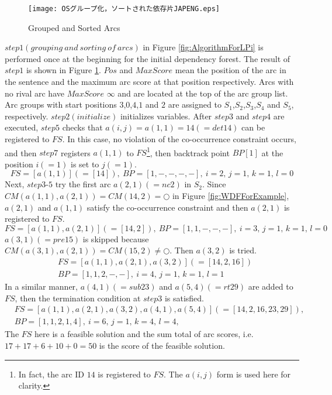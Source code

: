 \begin{figure}[b]
\begin{center}
     \texttt{[image: OSグループ化，ソートされた依存片JAPENG.eps]}
\end{center}
\myfiglabelskippre
\caption{Grouped and Sorted Arcs}
\label{fig:SortedDepPces}
\end{figure}

$step1(grouping\ and\ sorting\ of\ arcs)$ in Figure
\ref{fig:AlgorithmForLPi} is performed once at the beginning for the
initial dependency forest. The result of $step1$ is shown in Figure
\ref{fig:SortedDepPces}. $Pos$ and $MaxScore$ mean the position of the
arc in the sentence and the maximum arc score at that position
respectively. Arcs with no rival arc have $MaxScore$ $\infty$ and are
located at the top of the arc group list. Arc groups with start
positions $3$,$0$,$4$,$1$ and $2$ are assigned to
$S_1$,$S_2$,$S_3$,$S_4$ and $S_5$, respectively. $step2(initialize)$
initializes variables. After $step3$ and $step4$ are executed, $step5$
checks that $a(i,j)=a(1,1)=14(=det14)$ can be registered to $FS$. In
this case, no violation of the co-occurrence constraint occurs, and
then $step7$ registers $a(1,1)$ to $FS$\footnote{In fact, the arc ID
$14$ is registered to $FS$. The $a(i,j)$ form is used here for
clarity.}, then backtrack point $BP[1]$ at the position $i(=1)$ is set
to $j(=1)$.
\[
 FS=[a(1,1)](=[14]), \ BP=[1,-,-,-,-], \ \text{$i=2$, $j=1$, $k=1$, $l=0$}
\]
Next, $step3$-$5$ try the first arc $a(2,1)(=nc2)$ in $S_2$. Since
$CM(a(1,1),a(2,1))=CM(14,2)=\bigcirc$ 
in Figure \ref{fig:WDFForExample},
$a(2,1)$ and $a(1,1)$ satisfy the co-occurrence constraint and then
$a(2,1)$ is registered to $FS$.
\[
 FS=[a(1,1),a(2,1)](=[14,2]),\ BP=[1,1,-,-,-], \ \text{$i=3$, $j=1$, $k=1$, $l=0$}
\]
    $a(3,1)(=pre15)$ is skipped because $CM(a(3,1),a(2,1))=CM(15,2){\ne}\bigcirc$. 
Then $a(3,2)$ is tried.
\begin{align*}
 & FS=[a(1,1),a(2,1),a(3,2)](=[14,2,16])\\
 & BP=[1,1,2,-,-], \ \text{$i=4$, $j=1$, $k=1$, $l=1$}
\end{align*}
In a similar manner, $a(4,1)(=sub23)$ and $a(5,4)(=rt29)$ are added to $FS$, then the termination condition at $step3$ is satisfied.
\begin{align*}
 & FS=[a(1,1),a(2,1),a(3,2),a(4,1),a(5,4)] (=[14,2,16,23,29]),\\
 & BP=[1,1,2,1,4], \ \text{$i=6$, $j=1$, $k=4$, $l=4$},
\end{align*}
The $FS$ here is a feasible solution and the sum total of arc scores,
i.e. $17+17+6+10+0=50$ is the score of the feasible solution.

